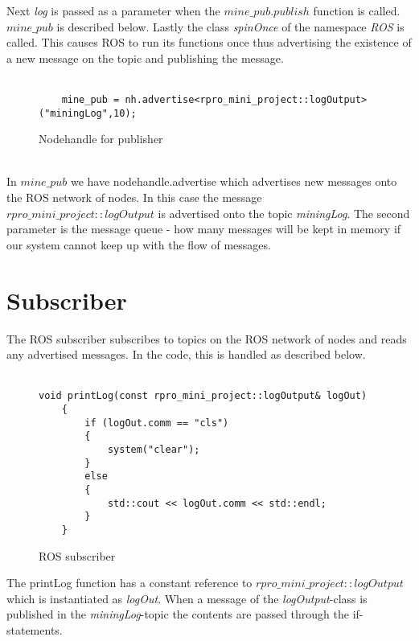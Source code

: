 Next \textit{log} is passed as a parameter when the $mine\_pub.publish$ function is called. $mine\_pub$ is described below. Lastly the class \textit{spinOnce} of the namespace \textit{ROS} is called. This causes ROS to run its functions once thus advertising the existence of a new message on the topic and publishing the message.\\
\\
\begin{figure}[!ht]
\begin{lstlisting}
    mine_pub = nh.advertise<rpro_mini_project::logOutput>("miningLog",10);
\end{lstlisting}
\vspace{-10mm}
\caption{Nodehandle for publisher}
\end{figure}
\\
In $mine\_pub$ we have nodehandle.advertise which advertises new messages onto the ROS network of nodes. In this case the message $rpro\_mini\_project::logOutput$ is advertised onto the topic \textit{miningLog}.
The second parameter is the message queue - how many messages will be kept in memory if our system cannot keep up with the flow of messages.

\newpage

\section{Subscriber}
The ROS subscriber subscribes to topics on the ROS network of nodes and reads any advertised messages. In the code, this is handled as described below.\\
\\
\begin{figure}[!ht]
\begin{lstlisting}
void printLog(const rpro_mini_project::logOutput& logOut)
    {
        if (logOut.comm == "cls")
        {
            system("clear");
        }
        else
        {
            std::cout << logOut.comm << std::endl;
        }
    }
\end{lstlisting}
\vspace{-10mm}
\caption{ROS subscriber}
\end{figure}

The printLog function has a constant reference to $rpro\_mini\_project::logOutput$ which is instantiated as \textit{logOut}. When a message of the \textit{logOutput}-class is published in the \textit{miningLog}-topic the contents are passed through the if-statements.

